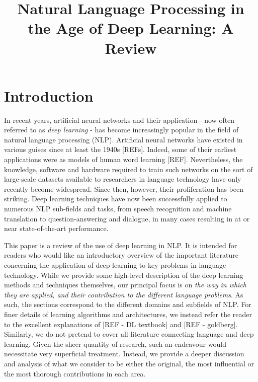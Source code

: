 \documentclass[11pt,letterpaper]{article}
\title{Natural Language Processing in the Age of Deep Learning: A Review}
\date{}
\begin{document}
\maketitle

\begin{abstract}

\end{abstract}


\section{Introduction}

In recent years, artificial neural networks and their application - now often referred to as \emph{deep learning} - has become increasingly popular in the field of natural language processing (NLP). Artificial neural networks have existed in various guises since at least the 1940s [REFs]. Indeed, some of their earliest applications were as models of human word learning [REF]. Nevertheless, the knowledge, software and hardware required to train such networks on the sort of large-scale datasets available to researchers in language technology have only recently become widespread. Since then, however, their proliferation has been striking. Deep learning techniques have now been successfully applied to numerous NLP sub-fields and tasks, from speech recognition and machine translation to question-answering and dialogue, in many cases resulting in at or near state-of-the-art performance.  

This paper is a review of the use of deep learning in NLP. It is intended for readers who would like an introductory overview of the important literature concerning the application of deep learning to key problems in language technology. While we provide some high-level description of the deep learning methods and techniques themselves, our principal focus is on \emph{the way in which they are applied, and their contribution to the different language problems}. As such, the sections correspond to the different domains and subfields of NLP. For finer details of learning algorithms and architectures, we instead refer the reader to the excellent explanations of [REF - DL textbook] and [REF - goldberg]. Similarly, we do not pretend to cover all literature connecting language and deep learning. Given the sheer quantity of research, such an endeavour would necessitate very superficial treatment. Instead, we provide a deeper discussion and analysis of what we consider to be either the original, the most influential or the most thorough contributions in each area. 
\end{document}
